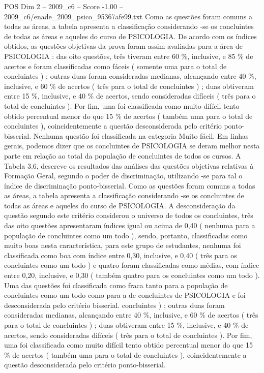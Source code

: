 \begin{textsample}{POS Dim 2 – 2009\_c6 – Score -1.00 – 2009\_c6/enade\_2009\_psico\_95367afe99.txt}
Como as questões foram comuns a todas as áreas, a tabela apresenta a classificação considerando -se os concluintes de todas as áreas e aqueles do curso de PSICOLOGIA.
De acordo com os índices obtidos, as questões objetivas da prova foram assim avaliadas para a área de PSICOLOGIA : das oito questões, três tiveram entre 60 \%, inclusive, e 85 \% de acertos e foram classificadas como fáceis ( somente uma para o total de concluintes ) ; outras duas foram consideradas medianas, alcançando entre 40 \%, inclusive, e 60 \% de acertos ( três para o total de concluintes ) ; duas obtiveram entre 15 \%, inclusive, e 40 \% de acertos, sendo consideradas difíceis ( três para o total de concluintes ).
Por fim, uma foi classificada como muito difícil tento obtido percentual menor do que 15 \% de acertos ( também uma para o total de concluintes ), coincidentemente a questão desconsiderada pelo critério ponto-bisserial.
Nenhuma questão foi classificada na categoria Muito fácil.
Em linhas gerais, podemos dizer que os concluintes de PSICOLOGIA se deram melhor nesta parte em relação ao total da população de concluintes de todos os cursos.
A Tabela 3.6, descreve os resultados das análises das questões objetivas relativas à Formação Geral, segundo o poder de discriminação, utilizando -se para tal o índice de discriminação ponto-bisserial.
Como as questões foram comuns a todas as áreas, a tabela apresenta a classificação considerando -se os concluintes de todas as áreas e aqueles do curso de PSICOLOGIA.
A desconsideração da questão segundo este critério considerou o universo de todos os concluintes, três das oito questões apresentaram índices igual ou acima de 0,40 ( nenhuma para a população de concluintes como um todo ), sendo, portanto, classificadas como muito boas nesta característica, para este grupo de estudantes, nenhuma foi classificada como boa com índice entre 0,30, inclusive, e 0,40 ( três para os concluintes como um todo ) e quatro foram classificadas como médias, com índice entre 0,20, inclusive, e 0,30 ( também quatro para os concluintes como um todo ).
Uma das questões foi classificada como fraca tanto para a população de concluintes como um todo como para a de concluintes de PSICOLOGIA e foi desconsiderada pelo critério bisserial. concluintes ) ; outras duas foram consideradas medianas, alcançando entre 40 \%, inclusive, e 60 \% de acertos ( três para o total de concluintes ) ; duas obtiveram entre 15 \%, inclusive, e 40 \% de acertos, sendo consideradas difíceis ( três para o total de concluintes ).
Por fim, uma foi classificada como muito difícil tento obtido percentual menor do que 15 \% de acertos ( também uma para o total de concluintes ), coincidentemente a questão desconsiderada pelo critério ponto-bisserial.

\end{textsample}
